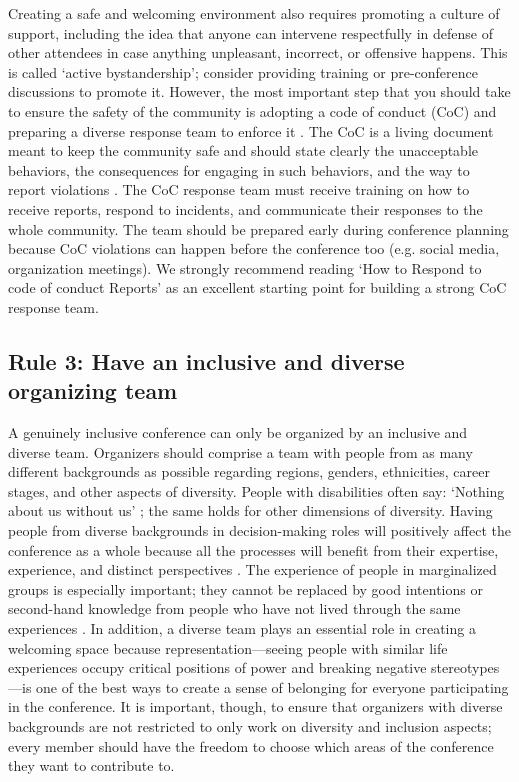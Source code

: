\documentclass[10pt,letterpaper]{article}
\begin{document}
Creating a safe and welcoming environment also requires promoting a culture of support, including the idea that anyone can intervene respectfully in defense of other attendees in case anything unpleasant, incorrect, or offensive happens.
This is called `active bystandership'; consider providing training or pre-conference discussions to promote it.
However, the most important step that you should take to ensure the safety of the community is
adopting a code of conduct (CoC) and preparing a diverse response team to enforce it \cite{favaroYourScienceConference2016}.
The CoC is a living document meant to keep the community safe and should state clearly the unacceptable behaviors, the consequences for engaging in such behaviors, and the way to report violations \cite{auroraHowRespondCode2019}.
The CoC response team must receive training on how to receive reports, respond to incidents, and communicate their responses to the whole community. The team should be prepared early during conference planning because CoC violations can happen before the conference too (e.g. social media, organization meetings).  
We strongly recommend reading `How to Respond to code of conduct Reports' \cite{auroraHowRespondCode2019} as an excellent starting point for building a strong CoC response team.
 

\subsection*{Rule 3: Have an inclusive and diverse organizing team}
\label{rule_organizing_team}

A genuinely inclusive conference can only be organized by an inclusive and diverse team.
Organizers should comprise a team with people from as many different backgrounds as possible regarding regions, genders, ethnicities, career stages, and other aspects of diversity.
People with disabilities often say: `Nothing about us without us' \cite{charlton_nothing_1998, werner_nothing_1998}; the same holds for other dimensions of diversity. 
Having people from diverse backgrounds in decision-making roles will positively affect the conference as a whole because all the processes will benefit from their expertise, experience, and distinct perspectives \cite{hongGroupsDiverseProblem2004}. 
The experience of people in marginalized groups
is especially important; they cannot be replaced by good intentions or second-hand knowledge from people who have not lived through the same experiences \cite{costanzachockDesign2020}.
In addition, a diverse team plays an essential role in creating a welcoming space because representation—seeing people with similar life experiences occupy critical positions of power and breaking negative stereotypes—is one of the best ways to create a sense of belonging for everyone participating in the conference.
It is important, though, to ensure that organizers with diverse backgrounds are not restricted to only work on diversity and inclusion aspects; 
every member should have the freedom to choose which areas of the conference they want to contribute to.
\end{document}
